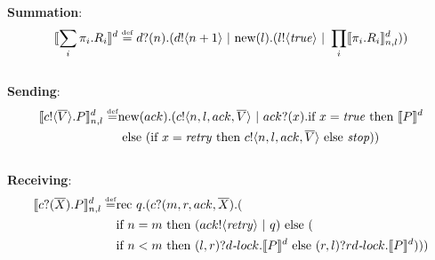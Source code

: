 \documentclass[12pt,twoside]{reedthesis}
\begin{document}
		\newpage
		\null\vfil
	  
		\centering \textbf{Summation}:
		\[
			\llbracket{\displaystyle\sum_{i} \pi_i.R_i}\rrbracket^d \overset{\mbox{\tiny{def}}}{=} {d}?({n}).({d}!\langle{n+1}\rangle \ |\  \text{new}({l}).({l}!\langle{ \ensuremath{\text{\emph{true}}} }\rangle \ |\  \displaystyle\prod_{i}\llbracket{\pi_i.R_i}\rrbracket^d_{n,l}))
		\]\\[20pt]
		
		\centering \textbf{Sending}:
		\begin{equation*}\begin{split}
			\llbracket{ \ensuremath{{c}!\langle{ \ensuremath{\overline{V}} }\rangle.} P}\rrbracket^d_{n,l} \overset{\mbox{\tiny{def}}}{=} & \text{new}({ack}).({c}!\langle{n,l,ack, \ensuremath{\overline{V}} }\rangle \ |\  {ack}?({x}). \text{if } {x= \ensuremath{\text{\emph{true}}} } \text{ then } \llbracket{P}\rrbracket^d \\
			&\text{ else } (\text{if } {x= \ensuremath{\text{\emph{retry}}} } \text{ then } {c}!\langle{n,l,ack, \ensuremath{\overline{V}} }\rangle \text{ else } \mbox{\emph{stop}}))
		\end{split}\end{equation*}\\[20pt]
		
		\centering \textbf{Receiving}:
		\begin{equation*}\begin{split}
			\llbracket{ \ensuremath{{c}?({\overline{X}}).} P}\rrbracket^d_{n,l} \overset{\mbox{\tiny{def}}}{=} & \text{rec }{q}.({c}?({m,r,ack,\overline{X}}).(\\
			&\text{if } {n=m} \text{ then } ({ack}!\langle{ \ensuremath{\text{\emph{retry}}} }\rangle\ |\  q) \text{ else }(\\
			&\text{if } {n<m} \text{ then } (l,r)?d\mbox{\emph{-}}lock.\llbracket{P}\rrbracket^d \text{ else } (r,l)?rd\mbox{\emph{-}}lock.\llbracket{P}\rrbracket^d)))\\
		\end{split}\end{equation*}\\[20pt]
		
\end{document}
